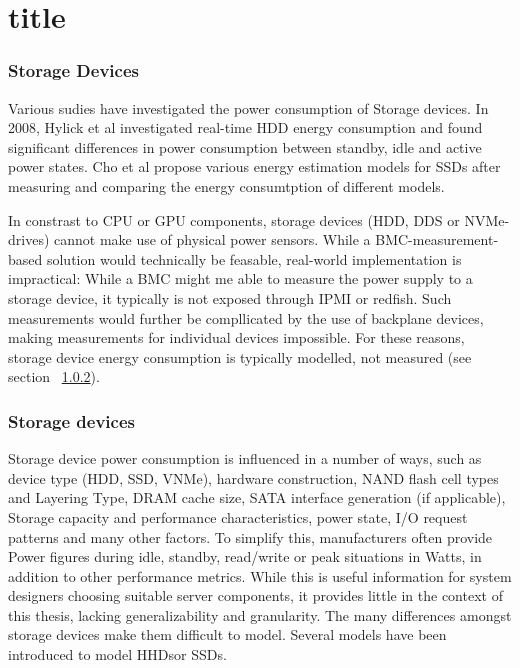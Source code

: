 \chapter{title} %
\label{ChapterX}


\subsection{Storage Devices}
Various sudies have investigated the power consumption of Storage devices. In 2008, Hylick et al\parencite{hylickAnalysisHardDrive2008a} investigated real-time HDD energy consumption and found significant differences in power consumption between standby, idle and active power states. Cho et al\parencite{choDesignTradeoffsSSDs2015} propose various energy estimation models for SSDs after measuring and comparing the energy consumtption of different models. 

In constrast to CPU or GPU components, storage devices (HDD, DDS or NVMe-drives) cannot make use of physical power sensors. While a BMC-measurement-based solution would technically be feasable, real-world implementation is impractical: While a BMC might me able to measure the power supply to a storage device, it typically is not exposed through IPMI or redfish. Such measurements would further be compllicated by the use of backplane devices, making measurements for individual devices impossible. For these reasons, storage device energy consumption is typically modelled, not measured (see section ~\ref{sec:storageModeling}). 


\subsection{Storage devices}
\label{sec:storageModeling}
Storage device power consumption is influenced in a number of ways, such as device type (HDD, SSD, VNMe), hardware construction, NAND flash cell types and Layering Type, DRAM cache size, SATA interface generation (if applicable), Storage capacity and performance characteristics, power state, I/O request patterns and many other factors\parencite{hylickAnalysisHardDrive2008a, choDesignTradeoffsSSDs2015, storedbits_ssd_power, shinPowerConsumptionCharacterization}. To simplify this, manufacturers often provide Power figures during idle, standby, read/write or peak situations in Watts, in addition to other performance metrics. While this is useful information for system designers choosing suitable server components, it provides little in the context of this thesis, lacking generalizability and granularity. The many differences amongst storage devices make them difficult to model. Several models have been introduced to model HHDsor SSDs\parencite{choDesignTradeoffsSSDs2015, liWhichStorageDevice2014}. 

